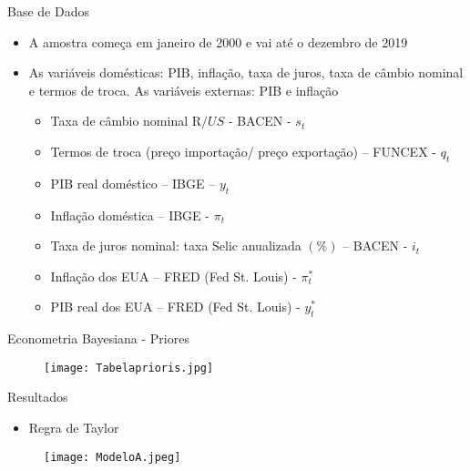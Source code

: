 \documentclass[9pt]{beamer}
\let\olditem\item
\renewcommand{\item}{%
\olditem\vspace{\fill}}
\begin{document}
\begin{frame}{Base de Dados}
\begin{itemize}
    \item A amostra começa em janeiro de 2000 e vai até o dezembro de 2019
    
    \item As variáveis domésticas: PIB, inflação, taxa de juros, taxa de câmbio nominal e termos de troca. As variáveis externas: PIB e inflação
    
    \begin{itemize}
        \item 	Taxa de câmbio nominal R$/US$ - BACEN - $s_t$
        
        \item 	Termos de troca (preço importação/ preço exportação) – FUNCEX - $q_t$
        
        \item 	PIB real doméstico – IBGE – $y_t$
        
        \item 	Inflação doméstica – IBGE - $\pi_t$
        
        \item 	Taxa de juros nominal: taxa Selic anualizada $(\%)$ – BACEN - $i_t$
        
        \item 	Inflação dos EUA – FRED (Fed St. Louis) -  $\pi_t^{*}$
        
        \item PIB real dos EUA – FRED (Fed St. Louis) -  $y_t^{*}$
    \end{itemize}
    
    
\end{itemize}
\end{frame}
\begin{frame}{Econometria Bayesiana - Priores}
\begin{figure}[H]
\centering
\texttt{[image: Tabelaprioris.jpg]}
\end{figure}


\end{frame}
\begin{frame}{Resultados}
\begin{itemize}
    \item Regra de Taylor
\end{itemize}
\begin{figure}[H]
\centering
\texttt{[image: ModeloA.jpeg]}
\end{figure}

\end{frame}
\end{document}

